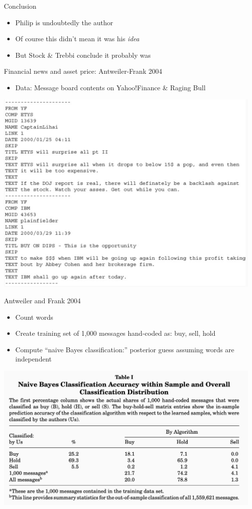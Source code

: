 \documentclass[english]{beamer}
\begin{document}
\begin{frame}{Conclusion}
\setlength{\itemsep}{0.7em}
\begin{itemize}
\item Philip is undoubtedly the author
 \item Of course this didn't mean it was his \textit{idea}
\item But Stock \& Trebbi conclude it probably was
\end{itemize}
\end{frame}

\begin{frame}{Financial news and asset price: Antweiler-Frank 2004}
\begin{itemize}
\item Data: Message board contents on Yahoo!Finance \& Raging Bull
\end{itemize}
\vspace{10pt}
\centering
\includegraphics[width=0.75 \textwidth]{Images/antfrank1.png}
\end{frame}

\begin{frame}{Antweiler and Frank 2004}
\begin{itemize}
\setlength{\itemsep}{0.7em}
\item Count words
\item Create training set of 1,000 messages hand-coded as: buy, sell, hold
\item Compute ``naive Bayes classification:'' posterior guess assuming words are independent
\end{itemize}
\centering
\includegraphics[width=0.85 \textwidth]{Images/antfrank2.png}
\end{frame}
\end{document}
